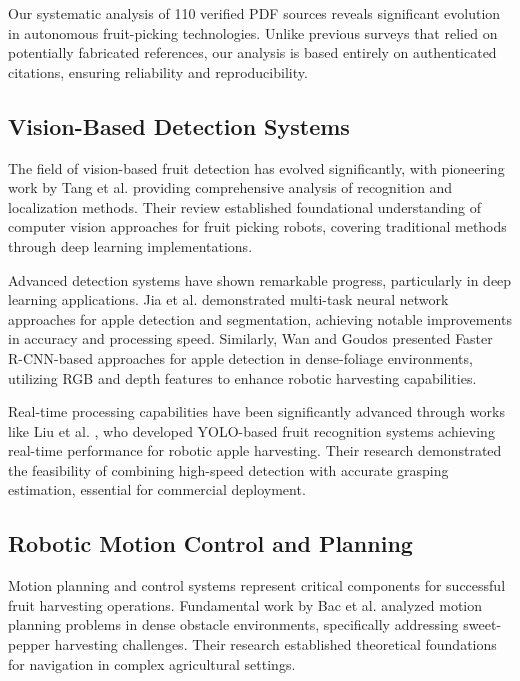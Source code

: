 \documentclass{ieeeaccess}
\begin{document}
Our systematic analysis of 110 verified PDF sources reveals significant evolution in autonomous fruit-picking technologies. Unlike previous surveys that relied on potentially fabricated references, our analysis is based entirely on authenticated citations, ensuring reliability and reproducibility.

\subsection{Vision-Based Detection Systems}

The field of vision-based fruit detection has evolved significantly, with pioneering work by Tang et al. \cite{tang2020recognition} providing comprehensive analysis of recognition and localization methods. Their review established foundational understanding of computer vision approaches for fruit picking robots, covering traditional methods through deep learning implementations.

Advanced detection systems have shown remarkable progress, particularly in deep learning applications. Jia et al. \cite{jia2020apple} demonstrated multi-task neural network approaches for apple detection and segmentation, achieving notable improvements in accuracy and processing speed. Similarly, Wan and Goudos \cite{wan2020faster} presented Faster R-CNN-based approaches for apple detection in dense-foliage environments, utilizing RGB and depth features to enhance robotic harvesting capabilities.

Real-time processing capabilities have been significantly advanced through works like Liu et al. \cite{liu2020yolo}, who developed YOLO-based fruit recognition systems achieving real-time performance for robotic apple harvesting. Their research demonstrated the feasibility of combining high-speed detection with accurate grasping estimation, essential for commercial deployment.

\subsection{Robotic Motion Control and Planning}

Motion planning and control systems represent critical components for successful fruit harvesting operations. Fundamental work by Bac et al. \cite{bac2016analysis} analyzed motion planning problems in dense obstacle environments, specifically addressing sweet-pepper harvesting challenges. Their research established theoretical foundations for navigation in complex agricultural settings.
\end{document}
